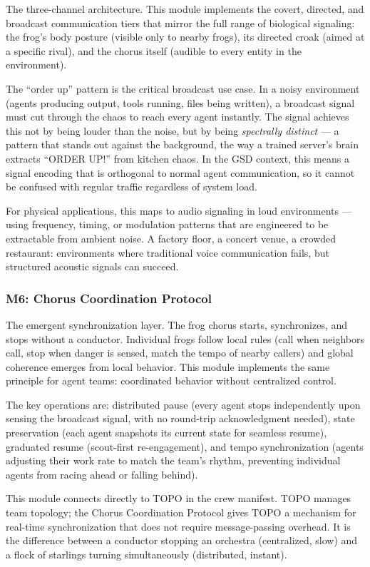 \documentclass[11pt,letterpaper]{article}
\begin{document}
The three-channel architecture. This module implements the covert, directed, and broadcast communication tiers that mirror the full range of biological signaling: the frog's body posture (visible only to nearby frogs), its directed croak (aimed at a specific rival), and the chorus itself (audible to every entity in the environment).

The ``order up'' pattern is the critical broadcast use case. In a noisy environment (agents producing output, tools running, files being written), a broadcast signal must cut through the chaos to reach every agent instantly. The signal achieves this not by being louder than the noise, but by being \textit{spectrally distinct} --- a pattern that stands out against the background, the way a trained server's brain extracts ``ORDER UP!'' from kitchen chaos. In the GSD context, this means a signal encoding that is orthogonal to normal agent communication, so it cannot be confused with regular traffic regardless of system load.

For physical applications, this maps to audio signaling in loud environments --- using frequency, timing, or modulation patterns that are engineered to be extractable from ambient noise. A factory floor, a concert venue, a crowded restaurant: environments where traditional voice communication fails, but structured acoustic signals can succeed.

\subsubsection{M6: Chorus Coordination Protocol}

The emergent synchronization layer. The frog chorus starts, synchronizes, and stops without a conductor. Individual frogs follow local rules (call when neighbors call, stop when danger is sensed, match the tempo of nearby callers) and global coherence emerges from local behavior. This module implements the same principle for agent teams: coordinated behavior without centralized control.

The key operations are: distributed pause (every agent stops independently upon sensing the broadcast signal, with no round-trip acknowledgment needed), state preservation (each agent snapshots its current state for seamless resume), graduated resume (scout-first re-engagement), and tempo synchronization (agents adjusting their work rate to match the team's rhythm, preventing individual agents from racing ahead or falling behind).

This module connects directly to TOPO in the crew manifest. TOPO manages team topology; the Chorus Coordination Protocol gives TOPO a mechanism for real-time synchronization that does not require message-passing overhead. It is the difference between a conductor stopping an orchestra (centralized, slow) and a flock of starlings turning simultaneously (distributed, instant).
\end{document}
